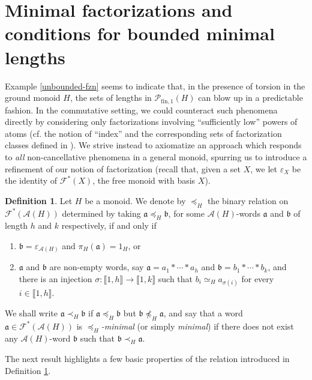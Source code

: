 \documentclass{report}
\newcommand{\A}{\mathcal{A}}
\renewcommand{\P}{\mathcal{P}}
\newcommand{\llb}{\llbracket}
\newcommand{\rrb}{\rrbracket}
\newcommand{\fun}{{\textrm{fin}, 1}}
\renewcommand{\:}{\text{:}}
\theoremstyle{definition}
\newtheorem{defn}{Definition}[section]
\begin{document}
\section{Minimal factorizations and conditions for bounded minimal lengths} \label{sec:min-fac}
\label{sec:minimal-factorizations}
%

%
Example \ref{unbounded-fzn} seems to indicate that, in the presence of torsion in the ground monoid $H$, the sets of lengths in $\P_\fun(H)$ can blow up in a predictable fashion.
In the commutative setting, we could counteract such phenomena directly by considering only factorizations involving ``sufficiently low'' powers of atoms (cf. the notion of ``index'' and the corresponding sets of factorization classes defined in \cite{geroldinger-lettl90}).
We strive instead to axiomatize an approach which responds to \textit{all} non-cancellative phenomena in a general monoid, spurring us to introduce a refinement of our notion of factorization (recall that, given a set $X$, we let $\varepsilon_X$ be the identity of $\mathscr F^\ast(X)$, the free monoid with basis $X$).
%
\begin{defn}\label{def:preorder}
	Let $H$ be a monoid. We denote by $\preceq_H$ 
	the binary relation on $\mathscr F^\ast(\mathscr A(H))$ determined by taking $\mathfrak a \preceq_H \mathfrak b$, for some  
	$\mathscr A(H)$-words $\mathfrak a$ and $\mathfrak b$ of length $h$ and $k$ respectively, if and only if 
	\begin{enumerate}[label=$\bullet$]
		\item $\mathfrak b = \varepsilon_{\mathscr A(H)}$ and $\pi_H(\mathfrak a) = 1_H$, or
		\item $\mathfrak a$ and $\mathfrak b$ are non-empty words, say $\mathfrak a = a_1 \ast \cdots \ast a_h$ and $\mathfrak b = b_1 \ast \cdots \ast b_k$, and
		there is an injection $\sigma: \llb 1, h \rrb \to \llb 1, k \rrb$ such that $b_i \simeq_H a_{\sigma(i)}$ for every $i \in \llb 1, h \rrb$. 
	\end{enumerate}
	We shall write $\mathfrak{a} \prec_H \mathfrak{b}$ if $\mathfrak{a} \preceq_H \mathfrak{b}$ but $\mathfrak{b} \not\preceq_H \mathfrak{a}$, and say that a word $\mathfrak{a} \in \mathscr F^\ast(\mathscr A(H))$ is \textit{$\preceq_H$-minimal} (or simply \textit{minimal}) if there does not exist any $\A(H)$-word $\mathfrak{b}$ such that $\mathfrak{b} \prec_H \mathfrak{a}$.
\end{defn}
%
The next result highlights a few basic properties of the relation introduced in Definition \ref{def:preorder}.
\end{document}
